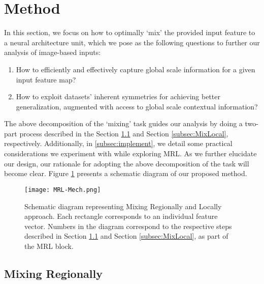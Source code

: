 \documentclass{article}
\begin{document}
\section{Method}

In this section, we focus on how to optimally `mix' the provided input feature to a neural architecture unit, which we pose as the following questions to further our analysis of image-based inputs: 
\begin{enumerate}
    \item How to efficiently and effectively capture global scale information for a given input feature map?
    \item How to exploit datasets' inherent symmetries for achieving better generalization, augmented with access to global scale contextual information? 
\end{enumerate}
The above decomposition of the `mixing' task guides our analysis by doing a two-part process described in the Section \ref{subsec:MixRegion} and Section \ref{subsec:MixLocal}, respectively. Additionally, in \ref{subsec:implement}, we detail some practical considerations we experiment with while exploring MRL. As we further elucidate our design, our rationale for adopting the above decomposition of the task will become clear. Figure \ref{fig:MRL-Mech} presents a schematic diagram of our proposed method.

\begin{figure}[ht]
    \centering
    \texttt{[image: MRL-Mech.png]}
    \caption{Schematic diagram representing Mixing Regionally and Locally approach. Each rectangle corresponds to an individual feature vector. Numbers in the diagram correspond to the respective steps described in Section \ref{subsec:MixRegion} and Section \ref{subsec:MixLocal}, as part of the MRL block.}
    \label{fig:MRL-Mech}
\end{figure}

\subsection{Mixing Regionally}\label{subsec:MixRegion}
\end{document}
